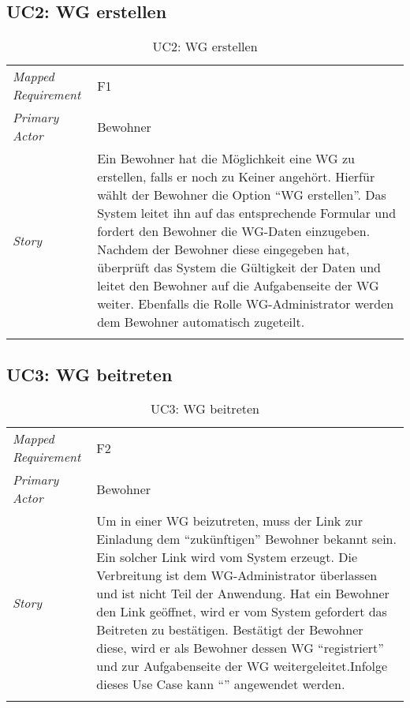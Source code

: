 \subsection{UC2: WG erstellen}\label{subsec:uc2}
\begin{table}[H]
	\tablestyle
	\tablealtcolored
	\begin{tabularx}{\textwidth}{lX}
		\tablebody
			\textit{Mapped Requirement} &
			F1
			\tabularnewline
			\textit{Primary Actor} &
			Bewohner
			\tabularnewline
			\textit{Story} &
			Ein Bewohner hat die Möglichkeit eine WG zu erstellen, falls er noch zu Keiner angehört. Hierfür wählt der Bewohner die Option ``WG erstellen''. Das System leitet ihn auf das entsprechende Formular und fordert den Bewohner die WG-Daten einzugeben. Nachdem der Bewohner diese eingegeben hat, überprüft das System die Gültigkeit der Daten und leitet den Bewohner auf die Aufgabenseite der WG weiter. Ebenfalls die Rolle WG-Administrator werden dem Bewohner automatisch zugeteilt.
			\tabularnewline
		\tableend
	\end{tabularx}
	\caption{UC2: WG erstellen}
\end{table}


\subsection{UC3: WG beitreten}\label{subsec:uc3}
\begin{table}[H]
	\tablestyle
	\tablealtcolored
	\begin{tabularx}{\textwidth}{lX}
		\tablebody
			\textit{Mapped Requirement} &
			F2
			\tabularnewline
			\textit{Primary Actor} &
			Bewohner
			\tabularnewline
			\textit{Story} &
			Um in einer WG beizutreten, muss der Link zur Einladung dem ``zukünftigen'' Bewohner bekannt sein. Ein solcher Link wird vom System erzeugt. Die Verbreitung ist dem WG-Administrator überlassen und ist nicht Teil der Anwendung. Hat ein Bewohner den Link geöffnet, wird er vom System gefordert das Beitreten zu bestätigen. Bestätigt der Bewohner diese, wird er als Bewohner dessen WG ``registriert'' und zur Aufgabenseite der WG weitergeleitet.\newline Infolge dieses Use Case kann ``\nameref{subsec:uc11}'' angewendet werden.
			\tabularnewline
		\tableend
	\end{tabularx}
	\caption{UC3: WG beitreten}
\end{table}


